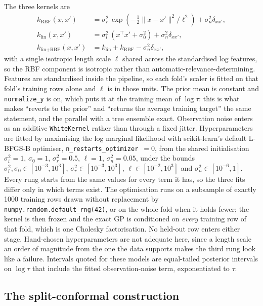 \documentclass[12pt,letterpaper]{article}
\begin{document}
The three kernels are
\begin{align}
k_{\text{RBF}}(x,x') &= \sigma_r^{2}\,
  \exp\!\left(-\tfrac{1}{2}\lVert x-x'\rVert^{2}/\ell^{2}\right) + \sigma_n^{2}\delta_{xx'},
  \nonumber\\
k_{\text{lin}}(x,x') &= \sigma_l^{2}\,(x^{\!\top}\!x' + \sigma_0^{2})
  + \sigma_n^{2}\delta_{xx'},
  \nonumber\\
k_{\text{lin+RBF}}(x,x') &= k_{\text{lin}} + k_{\text{RBF}} - \sigma_n^{2}\delta_{xx'},
\end{align}
with a single isotropic length scale $\ell$ shared across the standardised log
features, so the RBF component is isotropic rather than
automatic-relevance-determining. Features are standardised inside the pipeline,
so each fold's scaler is fitted on that fold's training rows alone and $\ell$ is
in those units. The prior mean is constant and \texttt{normalize\_y} is on, which
puts it at the training mean of $\log\tau$: this is what makes ``reverts to the
prior'' and ``returns the average training target'' the same statement, and the
parallel with a tree ensemble exact. Observation noise enters as an additive
\texttt{WhiteKernel} rather than through a fixed jitter. Hyperparameters are
fitted by maximising the log marginal likelihood with scikit-learn's default
L-BFGS-B optimiser, \texttt{n\_restarts\_optimizer}~$=0$, from the shared
initialisation $\sigma_l^{2}=1$, $\sigma_0=1$, $\sigma_r^{2}=0.5$, $\ell=1$,
$\sigma_n^{2}=0.05$, under the bounds $\sigma_l^{2},\sigma_0 \in [10^{-3},
10^{3}]$, $\sigma_r^{2}\in[10^{-3},10^{3}]$, $\ell\in[10^{-2},10^{3}]$ and
$\sigma_n^{2}\in[10^{-6},1]$. Every rung starts from the same values for every
term it has, so the three fits differ only in which terms exist. The
optimisation runs on a subsample of exactly 1000 training rows drawn without
replacement by \texttt{numpy.random.default\_rng(42)}, or on the whole fold when
it holds fewer; the kernel is then frozen and the exact GP is conditioned on
\emph{every} training row of that fold, which is one Cholesky factorisation. No
held-out row enters either stage. Hand-chosen hyperparameters are not adequate
here, since a length scale an order of magnitude from the one the data supports
makes the third rung look like a failure. Intervals quoted for these models are
equal-tailed posterior intervals on $\log\tau$ that include the fitted
observation-noise term, exponentiated to $\tau$.

\subsection{The split-conformal construction}
\label{supp:conformal}
\end{document}
